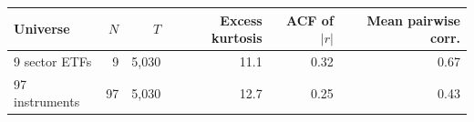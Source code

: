 \begin{tabular}{lrrrrr}
\toprule
Universe & $N$ & $T$ & Excess kurtosis & ACF of $|r|$ & Mean pairwise corr. \\
\midrule
9 sector ETFs & 9 & 5,030 & 11.1 & 0.32 & 0.67 \\
97 instruments & 97 & 5,030 & 12.7 & 0.25 & 0.43 \\
\bottomrule
\end{tabular}